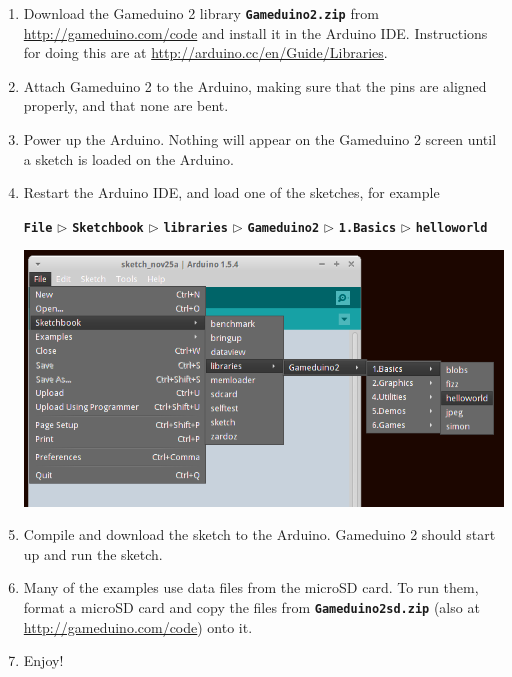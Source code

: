 \documentclass[10pt]{book}
\newcommand{\gdtwo}{Gameduino 2 }
\newcommand{\mach}[1]{\texttt{\textbf{#1}}}
\begin{document}
\begin{enumerate}

\item
Download the \gdtwo library \mach{Gameduino2.zip} from \\
\url{http://gameduino.com/code} and install it in the Arduino IDE.
Instructions for doing this are at
\url{http://arduino.cc/en/Guide/Libraries}.

\item
Attach \gdtwo to the Arduino, making sure that the pins are aligned properly,
and that none are bent.

\item
Power up the Arduino. Nothing will appear on the \gdtwo screen until a sketch is loaded on the Arduino.

\item
Restart the Arduino IDE, and load one of the sketches, for example \\
\begin{small}
\mach{File} $\triangleright$
\mach{Sketchbook} $\triangleright$
\mach{libraries} $\triangleright$
\mach{Gameduino2} $\triangleright$
\mach{1.Basics} $\triangleright$
\mach{helloworld}
\end{small}

\begin{center}
\includegraphics[width=1.0\textwidth]{menu.png}
\end{center}

\item
Compile and download the sketch to the Arduino.
\gdtwo should start up and run the sketch.

\item
Many of the examples use data files from the microSD card.
To run them, format a microSD card and copy the files
from \mach{Gameduino2sd.zip} (also at \url{http://gameduino.com/code})
onto it.

\item
Enjoy!

\end{enumerate}
\end{document}
